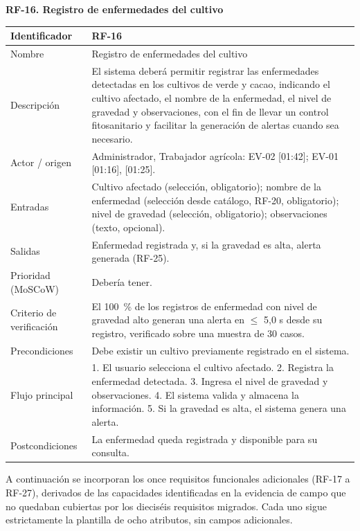 \documentclass[12pt,a4paper]{article}
\begin{document}
\begin{minipage}{\linewidth}
\bigskip
\noindent\textbf{RF-16. Registro de enfermedades del cultivo}
\label{tab:RF-16}

\begin{center}
\begin{tabular}{|p{3.5cm}|p{10.7cm}|}
\hline
Identificador & RF-16 \\
\hline
Nombre & Registro de enfermedades del cultivo \\
\hline
Descripción & El sistema deberá permitir registrar las enfermedades detectadas en los cultivos de verde y cacao, indicando el cultivo afectado, el nombre de la enfermedad, el nivel de gravedad y observaciones, con el fin de llevar un control fitosanitario y facilitar la generación de alertas cuando sea necesario. \\
\hline
Actor / origen & Administrador, Trabajador agrícola: EV-02 [01:42]; EV-01 [01:16], [01:25]. \\
\hline
Entradas & Cultivo afectado (selección, obligatorio); nombre de la enfermedad (selección desde catálogo, RF-20, obligatorio); nivel de gravedad (selección, obligatorio); observaciones (texto, opcional). \\
\hline
Salidas & Enfermedad registrada y, si la gravedad es alta, alerta generada (RF-25). \\
\hline
Prioridad (MoSCoW) & Debería tener. \\
\hline
Criterio de verificación & El 100~\% de los registros de enfermedad con nivel de gravedad alto generan una alerta en $\leq$ 5,0 s desde su registro, verificado sobre una muestra de 30 casos. \\
\hline
Precondiciones & Debe existir un cultivo previamente registrado en el sistema. \\
\hline
Flujo principal & 1. El usuario selecciona el cultivo afectado. 2. Registra la enfermedad detectada. 3. Ingresa el nivel de gravedad y observaciones. 4. El sistema valida y almacena la información. 5. Si la gravedad es alta, el sistema genera una alerta. \\
\hline
Postcondiciones & La enfermedad queda registrada y disponible para su consulta. \\
\hline
\end{tabular}
\end{center}
\end{minipage}

A continuación se incorporan los once requisitos funcionales adicionales (RF-17 a RF-27), derivados de las capacidades identificadas en la evidencia de campo que no quedaban cubiertas por los dieciséis requisitos migrados. Cada uno sigue estrictamente la plantilla de ocho atributos, sin campos adicionales.
\end{document}
